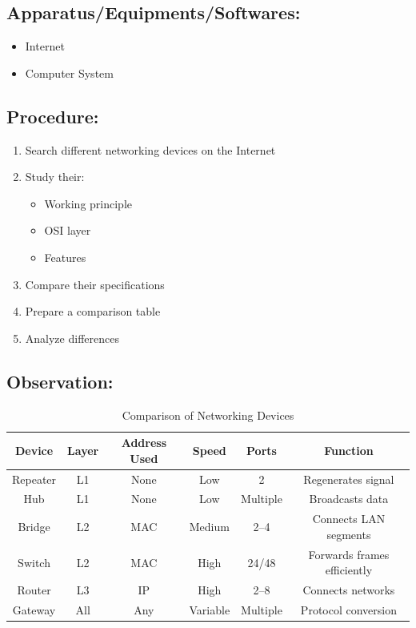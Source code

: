 \documentclass[a4paper,10pt]{article}
\begin{document}
\subsection{Apparatus/Equipments/Softwares:}
\begin{itemize}
    \item Internet
    \item Computer System
\end{itemize}

\subsection{Procedure:}
\begin{enumerate}
    \item Search different networking devices on the Internet
    
    \item Study their:
    \begin{itemize}
        \item Working principle
        \item OSI layer
        \item Features
    \end{itemize}
    
    \item Compare their specifications
    
    \item Prepare a comparison table
    
    \item Analyze differences
\end{enumerate}

\subsection{Observation:}
\begin{table}[H]
\centering
\begin{tabular}{|c|c|c|c|c|c|}
\hline
\textbf{Device} & \textbf{Layer} & \textbf{Address Used} & \textbf{Speed} & \textbf{Ports} & \textbf{Function} \\
\hline
Repeater & L1 & None & Low & 2 & Regenerates signal \\
Hub & L1 & None & Low & Multiple & Broadcasts data \\
Bridge & L2 & MAC & Medium & 2--4 & Connects LAN segments \\
Switch & L2 & MAC & High & 24/48 & Forwards frames efficiently \\
Router & L3 & IP & High & 2--8 & Connects networks \\
Gateway & All & Any & Variable & Multiple & Protocol conversion \\
\hline
\end{tabular}
\caption{Comparison of Networking Devices}
\label{tab:network_devices}
\end{table}
\end{document}
